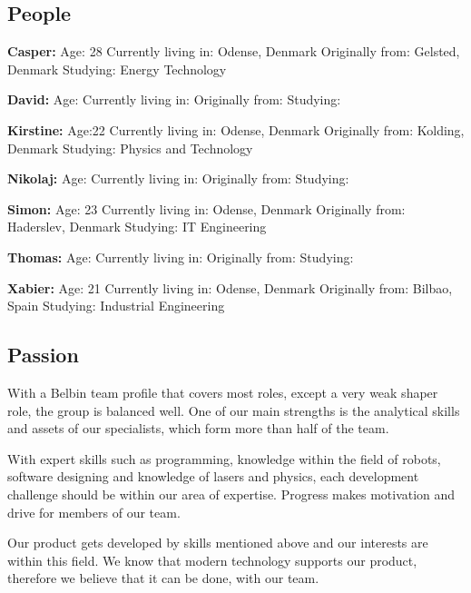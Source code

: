\subsection{People}

\textbf{Casper:}
Age: 28
Currently living in: Odense, Denmark
Originally from: Gelsted, Denmark
Studying: Energy Technology

\textbf{David:}
Age:
Currently living in:
Originally from:
Studying:

\textbf{Kirstine:}
Age:22
Currently living in: Odense, Denmark
Originally from: Kolding, Denmark
Studying: Physics and Technology

\textbf{Nikolaj:}
Age:
Currently living in:
Originally from:
Studying:

\textbf{Simon:}
Age: 23
Currently living in: Odense, Denmark
Originally from: Haderslev, Denmark
Studying: IT Engineering

\textbf{Thomas:}
Age:
Currently living in:
Originally from:
Studying:

\textbf{Xabier:}
Age: 21
Currently living in: Odense, Denmark
Originally from: Bilbao, Spain
Studying: Industrial Engineering

\subsection{Passion}
With a Belbin team profile that covers most roles, except a very weak shaper role, the group is balanced well. One of our main strengths is the analytical skills and assets of our specialists, which form more than half of the team.  

With expert skills such as programming, knowledge within the field of robots, software designing and knowledge of lasers and physics, each development challenge should be within our area of expertise. Progress makes motivation and drive for members of our team. 

Our product gets developed by skills mentioned above and our interests are within this field. We know that modern technology supports our product, therefore we believe that it can be done, with our team. 
